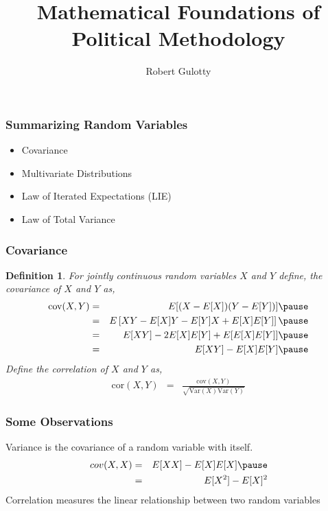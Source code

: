 \documentclass{beamer}
\title[PLSC 43401]{Mathematical Foundations of Political Methodology}
\author{Robert Gulotty}
\institute[Chicago]{University of Chicago}
\newtheorem{defn}{Definition}
\numberwithin{equation}{section}
\begin{document}
\begin{frame}
\maketitle
\end{frame}


\begin{frame}
\frametitle{Summarizing Random Variables}

\begin{itemize}
\item Covariance
\item Multivariate Distributions
\item Law of Iterated Expectations (LIE)
\item Law of Total Variance
\end{itemize}
\end{frame}







\begin{frame}
\frametitle{Covariance} 

\begin{defn} 
For jointly continuous random variables $X$ and $Y$ define, the covariance of $X$ and $Y$ as,\pause 
\begin{eqnarray}
\text{cov}(X,Y) & = & E[(X-E[X])(Y- E[Y])] \nonumber \pause  \\
& = & E\left[ XY - E[X] Y - E[Y] X + E[X]E[Y] \right] \nonumber \pause  \\
& = & E[XY] - 2E[X]E[Y] + E[E[X]E[Y]] \nonumber  \pause \\
& = & E[XY] - E[X]E[Y] \nonumber  \pause 
\end{eqnarray}
Define the correlation of $X$ and $Y$ as,  \pause 
\begin{eqnarray}
\text{cor}(X,Y) & =&  \frac{\text{cov}(X,Y) }{\sqrt{\text{Var}(X) \text{Var}(Y) } } \nonumber  
\end{eqnarray}
\end{defn} 

\end{frame}


\begin{frame}
\frametitle{Some Observations}

Variance is the covariance of a random variable with itself.\pause 
\begin{eqnarray}
cov(X,X) & = & E[X X] - E[X]E[X] \nonumber \pause \\
& = & E[X^2] - E[X]^2 \nonumber 
\end{eqnarray}
\pause 
Correlation measures the linear relationship between two random variables\\ \pause 

\end{frame}
\end{document}
